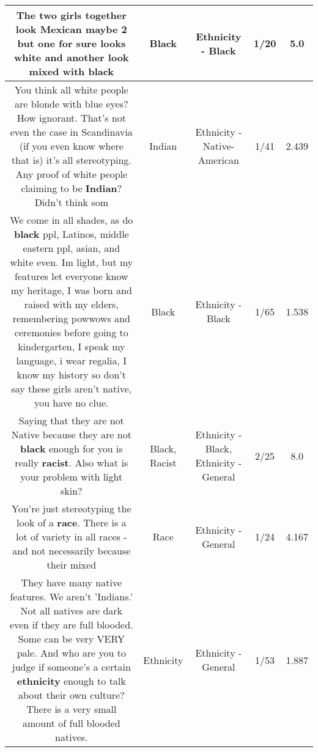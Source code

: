 \documentclass[11pt]{article}
\newlength\mylength
\begin{document}
\begin{center}
\begin{longtable}{|C{.65\mylength}|C{.30\mylength}|C{.12\mylength}|C{.12\mylength}|C{.12\mylength}|}
  \small The two girls together look Mexican maybe 2 but one for sure looks white and another look mixed with  black\normalsize   & Black & Ethnicity - Black & 1/20 & 5.0 \\  \hline
  \small You think all white people are blonde with blue eyes? How ignorant. That's not even the case in Scandinavia (if you even know where that is) it's all stereotyping. Any proof of white people claiming to be \textbf{Indian}? Didn't think som\normalsize   & Indian & Ethnicity - Native-American & 1/41 & 2.439 \\  \hline
  \small We come in all shades,  as do \textbf{black} ppl, Latinos,  middle eastern ppl, asian, and white even.  Im light, but my features let everyone know my heritage,  I was born and raised with my elders,  remembering powwows and ceremonies before going to kindergarten,  I speak my language, i wear regalia,  I know my history so don't say these girls aren't native,  you have no clue.\normalsize   & Black & Ethnicity - Black & 1/65 & 1.538 \\  \hline
  \small Saying that they are not Native because they are not \textbf{black} enough for you is really \textbf{racist}. Also what is your problem with light skin?\normalsize   & Black, Racist & Ethnicity - Black, Ethnicity - General & 2/25 & 8.0 \\  \hline
  \small You're just stereotyping the look of a \textbf{race}. There is a lot of variety in all races - and not necessarily because their mixed\normalsize   & Race & Ethnicity - General & 1/24 & 4.167 \\  \hline
  \small They have many native features. We aren't 'Indians.' Not all natives are dark even if they are full blooded. Some can be very VERY pale. And who are you to judge if someone's a certain \textbf{ethnicity} enough to talk about their own culture? There is a very small amount of full blooded natives.\normalsize   & Ethnicity & Ethnicity - General & 1/53 & 1.887 \\  \hline

\end{longtable}
\end{center}
\end{document}
